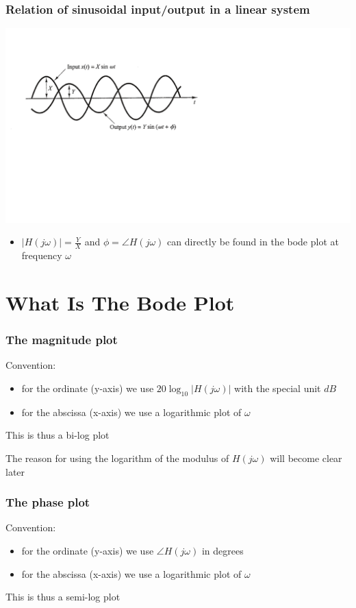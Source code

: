 \begin{frame}
\frametitle{Relation of sinusoidal input/output in a linear system}

\includegraphics[scale=0.5]{IOSinus}
\begin{itemize}
\item $|H(j\omega)| = \frac{Y}{X}$ and $\phi = \angle H(j\omega)$ can directly be found in the bode plot at frequency $\omega$
\end{itemize}

\end{frame}

\section{What Is The Bode Plot}

\begin{frame}
\frametitle{The magnitude plot}

Convention: 
\begin{itemize}
\item for the ordinate (y-axis) we use $20\log_{10}|H(j\omega)|$ with the special unit $dB$
\item for the abscissa (x-axis) we use a logarithmic plot of $\omega$

\end{itemize}
This is thus a bi-log plot

The reason for using the logarithm of the modulus of $H(j\omega)$ will become clear later

\end{frame}




\begin{frame}
\frametitle{The phase plot}
Convention:
\begin{itemize}
\item for the ordinate (y-axis) we use $\angle H(j\omega)$ in degrees
\item for the abscissa (x-axis) we use a logarithmic plot of $\omega$

\end{itemize}
This is thus a semi-log plot


\end{frame}


